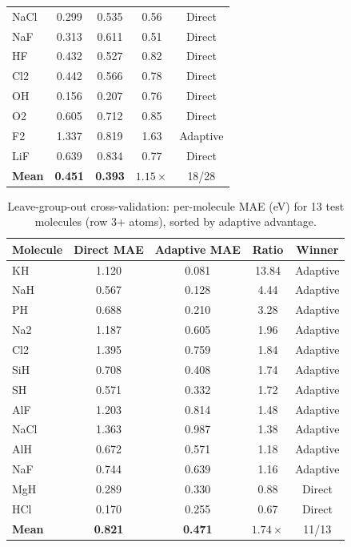 \documentclass[aps,prb,twocolumn,superscriptaddress,longbibliography,floatfix]{revtex4-2}
\begin{document}
\begin{table}[h]
\begin{ruledtabular}
\begin{tabular}{lcccc}
    NaCl & 0.299 & 0.535 & 0.56 & Direct \\
    NaF  & 0.313 & 0.611 & 0.51 & Direct \\
    HF   & 0.432 & 0.527 & 0.82 & Direct \\
    Cl2  & 0.442 & 0.566 & 0.78 & Direct \\
    OH   & 0.156 & 0.207 & 0.76 & Direct \\
    O2   & 0.605 & 0.712 & 0.85 & Direct \\
    F2   & 1.337 & 0.819 & 1.63 & Adaptive \\
    LiF  & 0.639 & 0.834 & 0.77 & Direct \\
    \hline
    \textbf{Mean} & \textbf{0.451} & \textbf{0.393} & $\mathbf{1.15\times}$ & 18/28 \\
  \end{tabular}
  \end{ruledtabular}
\end{table}

\begin{table}[h]
  \caption{Leave-group-out cross-validation: per-molecule MAE (eV) for 13 test molecules (row 3+ atoms), sorted by adaptive advantage.}
  \label{tab:dft_lgo}
  \begin{ruledtabular}
  \begin{tabular}{lcccc}
    Molecule & Direct MAE & Adaptive MAE & Ratio & Winner \\
    \hline
    KH   & 1.120 & 0.081 & 13.84 & Adaptive \\
    NaH  & 0.567 & 0.128 & 4.44 & Adaptive \\
    PH   & 0.688 & 0.210 & 3.28 & Adaptive \\
    Na2  & 1.187 & 0.605 & 1.96 & Adaptive \\
    Cl2  & 1.395 & 0.759 & 1.84 & Adaptive \\
    SiH  & 0.708 & 0.408 & 1.74 & Adaptive \\
    SH   & 0.571 & 0.332 & 1.72 & Adaptive \\
    AlF  & 1.203 & 0.814 & 1.48 & Adaptive \\
    NaCl & 1.363 & 0.987 & 1.38 & Adaptive \\
    AlH  & 0.672 & 0.571 & 1.18 & Adaptive \\
    NaF  & 0.744 & 0.639 & 1.16 & Adaptive \\
    MgH  & 0.289 & 0.330 & 0.88 & Direct \\
    HCl  & 0.170 & 0.255 & 0.67 & Direct \\
    \hline
    \textbf{Mean} & \textbf{0.821} & \textbf{0.471} & $\mathbf{1.74\times}$ & 11/13 \\
  \end{tabular}
  \end{ruledtabular}
\end{table}
\end{document}
